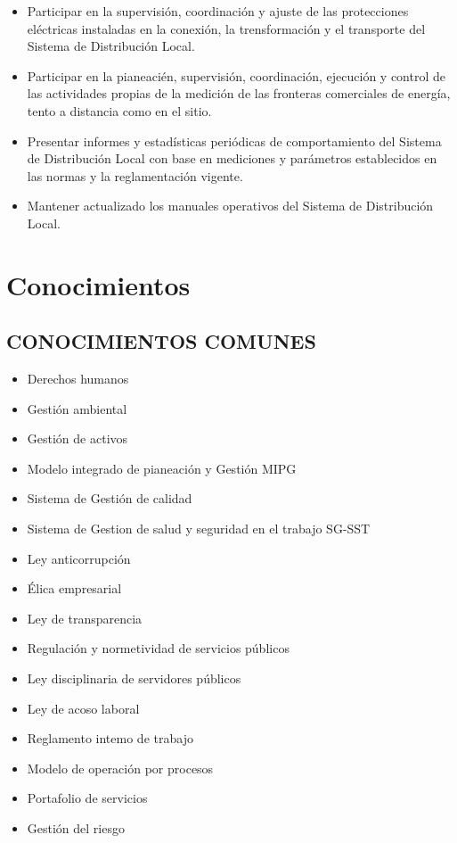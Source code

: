 \documentclass[a5paper]{book}%
\begin{document}
\begin{itemize}
	\item  Participar en la supervisión, coordinación y ajuste de las protecciones eléctricas instaladas en la conexión, la trensformación y el transporte del
	Sistema de Distribución Local.
	\item  Participar en la pianeacién, supervisión, coordinación, ejecución y control de las actividades propias de la medición de las fronteras comerciales de energía, tento a distancia como en el sitio.
	\item  Presentar informes y estadísticas  periódicas de comportamiento del Sistema de Distribución Local con base en mediciones y parámetros establecidos en las normas y la reglamentación vigente.
	\item  Mantener actualizado los manuales operativos del Sistema de Distribución Local.
\end{itemize}

\section{Conocimientos}

\subsection{CONOCIMIENTOS COMUNES}

\begin{itemize}
	\item Derechos humanos
	\item Gestión ambiental
	\item Gestión de activos
	\item Modelo integrado de pianeación y Gestión MIPG
	\item Sistema de Gestión de calidad
	\item Sistema de Gestion de salud y seguridad en el trabajo SG-SST
	\item Ley anticorrupción
	\item Élica empresarial
	\item Ley de transparencia
	\item Regulación y normetividad de servicios públicos
	\item Ley disciplinaria de servidores públicos
	\item Ley de acoso laboral
	\item Reglamento intemo de trabajo
	\item Modelo de operación por procesos
	\item Portafolio de servicios
	\item Gestión del riesgo
\end{itemize}
\end{document}
